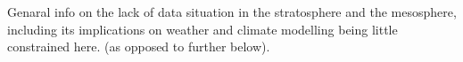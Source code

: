 Genaral info on the lack of data situation in the stratosphere and the mesosphere, including its implications on weather and climate modelling being little constrained here. (as opposed to further below).